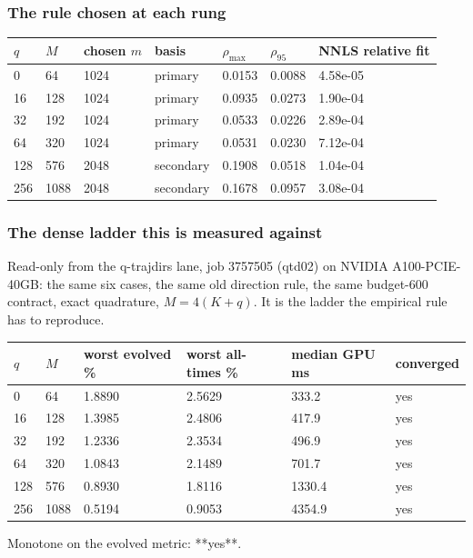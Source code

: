 \documentclass[11pt]{article}
\begin{document}
\subsubsection{The rule chosen at each rung}
\begin{table}[htbp]\centering\small
\begin{tabular}{lllllll}\hline
$q$ & $M$ & chosen $m$ & basis & $\rho_{\max}$ & $\rho_{95}$ & NNLS relative fit \\ \hline
0 & 64 & 1024 & primary & 0.0153 & 0.0088 & 4.58e-05 \\
16 & 128 & 1024 & primary & 0.0935 & 0.0273 & 1.90e-04 \\
32 & 192 & 1024 & primary & 0.0533 & 0.0226 & 2.89e-04 \\
64 & 320 & 1024 & primary & 0.0531 & 0.0230 & 7.12e-04 \\
128 & 576 & 2048 & secondary & 0.1908 & 0.0518 & 1.04e-04 \\
256 & 1088 & 2048 & secondary & 0.1678 & 0.0957 & 3.08e-04 \\
\hline\end{tabular}
\end{table}
\subsubsection{The dense ladder this is measured against}
Read-only from the q-trajdirs lane, job 3757505 (qtd02) on NVIDIA A100-PCIE-40GB: the same six cases, the same old direction rule, the same budget-600 contract, exact quadrature, $M = 4(K+q)$. It is the ladder the empirical rule has to reproduce.

\begin{table}[htbp]\centering\small
\begin{tabular}{llllll}\hline
$q$ & $M$ & worst evolved \% & worst all-times \% & median GPU ms & converged \\ \hline
0 & 64 & 1.8890 & 2.5629 & 333.2 & yes \\
16 & 128 & 1.3985 & 2.4806 & 417.9 & yes \\
32 & 192 & 1.2336 & 2.3534 & 496.9 & yes \\
64 & 320 & 1.0843 & 2.1489 & 701.7 & yes \\
128 & 576 & 0.8930 & 1.8116 & 1330.4 & yes \\
256 & 1088 & 0.5194 & 0.9053 & 4354.9 & yes \\
\hline\end{tabular}
\end{table}
Monotone on the evolved metric: **yes**.
\end{document}

